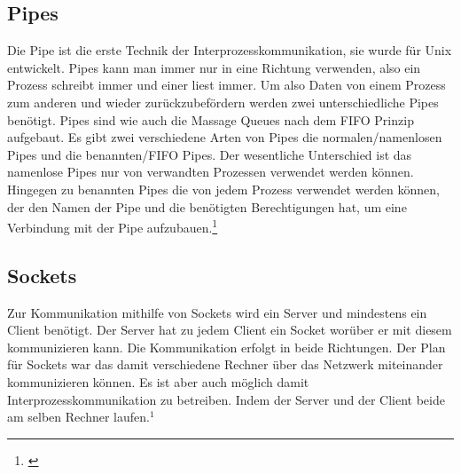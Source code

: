 \newpage
\subsection{Pipes}
Die Pipe ist die erste Technik der Interprozesskommunikation, sie wurde für Unix entwickelt. Pipes kann man immer nur in eine Richtung verwenden, also ein Prozess schreibt immer und einer liest immer.  Um also Daten von einem Prozess zum anderen und wieder zurückzubefördern werden zwei unterschiedliche Pipes benötigt. Pipes sind wie auch die Massage Queues nach dem FIFO Prinzip aufgebaut. Es gibt zwei verschiedene Arten von Pipes die normalen/namenlosen Pipes und die benannten/FIFO Pipes. Der wesentliche Unterschied ist das namenlose Pipes nur von verwandten Prozessen verwendet werden können. Hingegen zu benannten Pipes die von jedem Prozess verwendet werden können, der den Namen der Pipe und die benötigten Berechtigungen hat, um eine Verbindung mit der Pipe aufzubauen.\footnote[1]{\cite[Vgl.][]{30}}

\subsection{Sockets}
Zur Kommunikation mithilfe von Sockets wird ein Server und mindestens ein Client benötigt. Der Server hat  zu jedem Client ein Socket worüber er mit diesem kommunizieren kann. Die Kommunikation erfolgt in beide Richtungen. Der Plan für Sockets war das damit verschiedene Rechner über das Netzwerk miteinander kommunizieren können. Es ist aber auch möglich damit Interprozesskommunikation zu betreiben. Indem der Server und der Client beide am selben Rechner laufen.$^{1}$